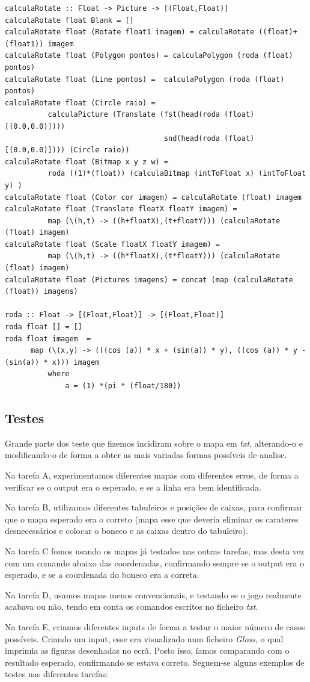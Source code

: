 \documentclass[a4paper]{article}
\begin{document}
\begin{Verbatim}[fontsize=\small]
calculaRotate :: Float -> Picture -> [(Float,Float)]
calculaRotate float Blank = []
calculaRotate float (Rotate float1 imagem) = calculaRotate ((float)+(float1)) imagem 
calculaRotate float (Polygon pontos) = calculaPolygon (roda (float) pontos)
calculaRotate float (Line pontos) =  calculaPolygon (roda (float) pontos)
calculaRotate float (Circle raio) = 
          calculaPicture (Translate (fst(head(roda (float) [(0.0,0.0)]))) 
                                     snd(head(roda (float) [(0.0,0.0)]))) (Circle raio))
calculaRotate float (Bitmap x y z w) = 
          roda ((1)*(float)) (calculaBitmap (intToFloat x) (intToFloat y) )
calculaRotate float (Color cor imagem) = calculaRotate (float) imagem 
calculaRotate float (Translate floatX floatY imagem) = 
          map (\(h,t) -> ((h+floatX),(t+floatY))) (calculaRotate (float) imagem)
calculaRotate float (Scale floatX floatY imagem) = 
          map (\(h,t) -> ((h*floatX),(t*floatY))) (calculaRotate (float) imagem)
calculaRotate float (Pictures imagens) = concat (map (calculaRotate (float)) imagens)

roda :: Float -> [(Float,Float)] -> [(Float,Float)]
roda float [] = []
roda float imagem  = 
      map (\(x,y) -> (((cos (a)) * x + (sin(a)) * y), ((cos (a)) * y - (sin(a)) * x))) imagem 
          where
              a = (1) *(pi * (float/180))

\end{Verbatim}
\newpage



\subsection{Testes}

Grande parte dos teste que fizemos incidiram sobre o mapa em \textit{txt}, alterando-o e modificando-o de forma a obter as mais variadas formas possíveis de analise. \par 
Na tarefa A, experimentamos diferentes mapas com diferentes erros, de forma a verificar se o output era o esperado, e se a linha era bem identificada. \par 
Na tarefa B, utilizamos diferentes tabuleiros e posições de caixas, para confirmar que o mapa esperado era o correto (mapa esse que deveria eliminar os carateres desnecessários e colocar o boneco e as caixas dentro do tabuleiro). \par 
Na tarefa C fomos usando os mapas já testados nas outras tarefas, mas desta vez com um comando abaixo das coordenadas, confirmando sempre se o output era o esperado, e se a coordenada do boneco era a correta. \par 
Na tarefa D, usamos mapas menos convencionais, e testando se o jogo realmente acabava ou não, tendo em conta os comandos escritos no ficheiro \textit{txt}. \par
Na tarefa E, criamos diferentes inputs de forma a testar o maior número de casos possíveis. Criando um input, esse era visualizado num ficheiro \textit{Gloss}, o qual imprimia as figuras desenhadas no ecrã. Posto isso, íamos comparando com o resultado esperado, confirmando se estava correto.
Seguem-se alguns exemplos de testes nas diferentes tarefas: 
\end{document}
